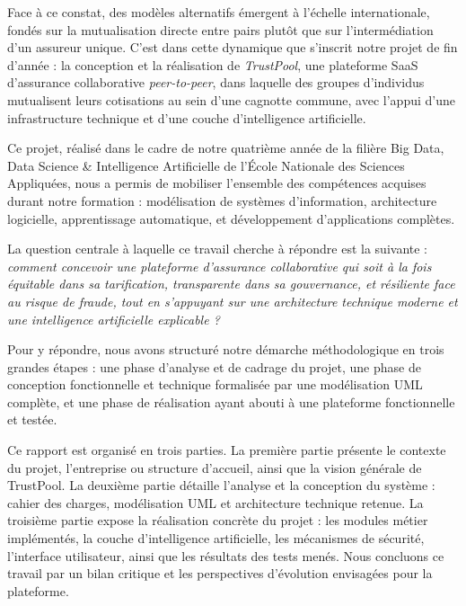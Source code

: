 \documentclass[12pt,a4paper]{report}
\begin{document}
Face à ce constat, des modèles alternatifs émergent à l'échelle internationale, fondés sur la mutualisation directe entre pairs plutôt que sur l'intermédiation d'un assureur unique. C'est dans cette dynamique que s'inscrit notre projet de fin d'année : la conception et la réalisation de \textit{TrustPool}, une plateforme SaaS d'assurance collaborative \textit{peer-to-peer}, dans laquelle des groupes d'individus mutualisent leurs cotisations au sein d'une cagnotte commune, avec l'appui d'une infrastructure technique et d'une couche d'intelligence artificielle.

Ce projet, réalisé dans le cadre de notre quatrième année de la filière Big Data, Data Science \& Intelligence Artificielle de l'École Nationale des Sciences Appliquées, nous a permis de mobiliser l'ensemble des compétences acquises durant notre formation : modélisation de systèmes d'information, architecture logicielle, apprentissage automatique, et développement d'applications complètes.

La question centrale à laquelle ce travail cherche à répondre est la suivante : \textit{comment concevoir une plateforme d'assurance collaborative qui soit à la fois équitable dans sa tarification, transparente dans sa gouvernance, et résiliente face au risque de fraude, tout en s'appuyant sur une architecture technique moderne et une intelligence artificielle explicable ?}

Pour y répondre, nous avons structuré notre démarche méthodologique en trois grandes étapes : une phase d'analyse et de cadrage du projet, une phase de conception fonctionnelle et technique formalisée par une modélisation UML complète, et une phase de réalisation ayant abouti à une plateforme fonctionnelle et testée.

Ce rapport est organisé en trois parties. La première partie présente le contexte du projet, l'entreprise ou structure d'accueil, ainsi que la vision générale de TrustPool. La deuxième partie détaille l'analyse et la conception du système : cahier des charges, modélisation UML et architecture technique retenue. La troisième partie expose la réalisation concrète du projet : les modules métier implémentés, la couche d'intelligence artificielle, les mécanismes de sécurité, l'interface utilisateur, ainsi que les résultats des tests menés. Nous concluons ce travail par un bilan critique et les perspectives d'évolution envisagées pour la plateforme.

\newpage

\end{document}
